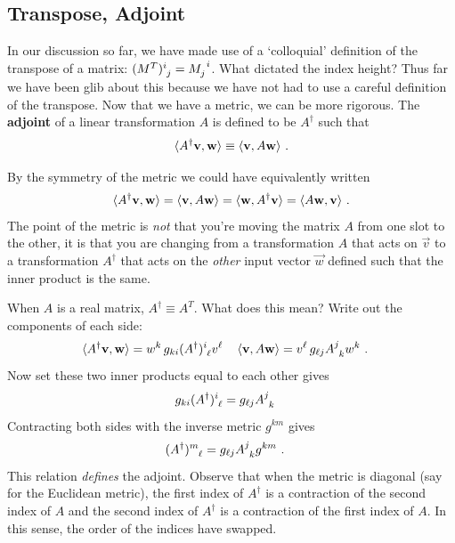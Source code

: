 \documentclass[12pt]{article}
\begin{document}
\subsection{Transpose, Adjoint}
\label{eq:transpose:adjoint}

In our discussion so far, we have made use of a `colloquial' definition of the transpose of a matrix: $(M^T)\aij{i}{j} = M_j^{\phantom{j}i}$. What dictated the index height? Thus far we have been glib about this because we have not had to use a careful definition of the transpose. Now that we have a metric, we can be more rigorous. The \textbf{adjoint} of a linear transformation $A$ is defined to be $A^\dag$ such that
\begin{align}
    \langle A^\dag \mathbf{v}, \mathbf{w} \rangle \equiv
    \langle \mathbf{v} , A \mathbf{w} \rangle \ .
\end{align}
\begin{example}
By the symmetry of the metric we could have equivalently written
\begin{align}
    \langle A^\dag \mathbf{v}, \mathbf{w} \rangle =
    \langle \mathbf{v} , A \mathbf{w} \rangle =
    \langle \mathbf{w}, A^\dag \mathbf{v} \rangle =
    \langle A \mathbf{w}, \mathbf{v} \rangle 
    \ .
\end{align}
The point of the metric is \emph{not} that you're moving the matrix $A$ from one slot to the other, it is that you are changing from a transformation $A$ that acts on $\vec{v}$ to a transformation $A^\dag$ that acts on the \emph{other} input vector $\vec{w}$ defined such that the inner product is the same.
\end{example}
When $A$ is a real matrix, $A^\dag \equiv A^T$. What does this mean? Write out the components of each side:
\begin{align}
    \la A^\dag \vec{v}, \vec{w} \ra
    &=
   w^k \, g_{ki}  (A^\dag)\aij{i}{\ell} v^\ell  \,  
    &
    \la  \vec{v},A \vec{w} \ra
    &=
   v^\ell\, g_{\ell j}  A\aij{j}{k} w^k  
   \ .
\end{align}
Now set these two inner products equal to each other gives
\begin{align}
    g_{ki}(A^\dag)\aij{i}{\ell}
    &=
    g_{\ell j} A\aij{j}{k}
\end{align}
Contracting both sides with the inverse metric $g^{km}$ gives
\begin{align}
    (A^\dag)\aij{m}{\ell} &= g_{\ell j} A\aij{j}{k} g^{km} \ .
    \label{eq:adjoint:def}
\end{align}
This relation \emph{defines} the adjoint. Observe that when the metric is diagonal (say for the Euclidean metric), the first index of $A^\dag$ is a contraction of the {second} index of $A$ and the second index of $A^\dag$ is a contraction of the first index of $A$. In this sense, the order of the indices have swapped. 
\end{document}
